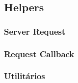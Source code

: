 \subsection{Helpers}

\subsubsection{Server Request}

\subsubsection{Request Callback}

\subsubsection{Utilitários}
